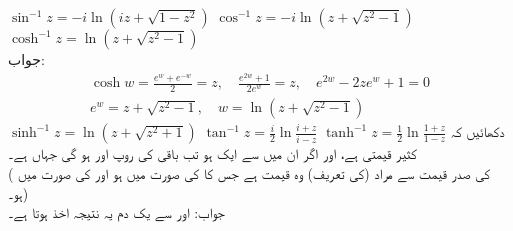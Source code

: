 \quad
$\sin^{-1}z=-i\ln(iz+\sqrt{1-z^2})$
\quad
$\cos^{-1}z=-i\ln(z+\sqrt{z^2-1})$
\quad
$\cosh^{-1}z=\ln(z+\sqrt{z^2-1})$\\
جواب:
\begin{align*}
\cosh w=\frac{e^w+e^{-w}}{2}=z,\quad \frac{e^{2w}+1}{2e^{w}}=z,\quad e^{2w}-2ze^{w}+1=0\\
e^w=z+\sqrt{z^2-1},\quad w=\ln (z+\sqrt{z^2-1})
\end{align*}
\quad
$\sinh^{-1}z=\ln(z+\sqrt{z^2+1})$
\quad
$\tan^{-1}z=\frac{i}{2}\ln\frac{i+z}{i-z}$
\quad
$\tanh^{-1}z=\frac{1}{2}\ln\frac{1+z}{1-z}$
\quad
دکھائیں کہ  کثیر قیمتی ہے، اور اگر  ان میں سے ایک ہو تب باقی کی روپ  اور  ہو گی جہاں  ہے۔\\
( کی صدر قیمت سے مراد (کی تعریف) وہ قیمت ہے جس کا  کی صورت میں  ہو اور  کی صورت میں  ہو۔)\\
جواب:\quad
{} اور  سے یک دم یہ نتیجہ اخذ ہوتا ہے۔

